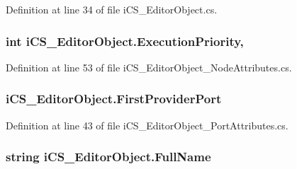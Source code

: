 Definition at line 34 of file i\+C\+S\+\_\+\+Editor\+Object.\+cs.

\hypertarget{classi_c_s___editor_object_aca7763f63d61d159f0d24e065459cf36}{
\subsubsection[{Execution\+Priority}]{\setlength{\rightskip}{0pt plus 5cm}int i\+C\+S\+\_\+\+Editor\+Object.\+Execution\+Priority\hspace{0.3cm}{\ttfamily [get]}, {\ttfamily [set]}}}\label{classi_c_s___editor_object_aca7763f63d61d159f0d24e065459cf36}


Definition at line 53 of file i\+C\+S\+\_\+\+Editor\+Object\+\_\+\+Node\+Attributes.\+cs.

\hypertarget{classi_c_s___editor_object_a772411f30de3cb27405d591520821c68}{
\subsubsection[{First\+Provider\+Port}]{ i\+C\+S\+\_\+\+Editor\+Object.\+First\+Provider\+Port\hspace{0.3cm}{\ttfamily [get]}}}\label{classi_c_s___editor_object_a772411f30de3cb27405d591520821c68}


Definition at line 43 of file i\+C\+S\+\_\+\+Editor\+Object\+\_\+\+Port\+Attributes.\+cs.

\hypertarget{classi_c_s___editor_object_a8b3877538c0493d1ab89ae44489112f6}{
\subsubsection[{Full\+Name}]{\setlength{\rightskip}{0pt plus 5cm}string i\+C\+S\+\_\+\+Editor\+Object.\+Full\+Name\hspace{0.3cm}{\ttfamily [get]}}}\label{classi_c_s___editor_object_a8b3877538c0493d1ab89ae44489112f6}


